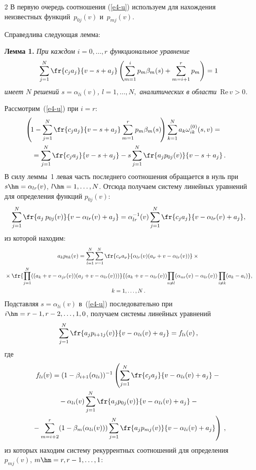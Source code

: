 \begin{multicols}{2}
В первую очередь соотношения (\ref{e4-u}) используем для нахождения 
неизвестных функций~$p_{0j}(v)$ и~$p_{mj}(v)$.

Справедлива следующая лемма:

\medskip

\noindent
\textbf{Лемма 1.} \textit{При каждом $i=0,\ldots,r$ функциональное уравнение}
\begin{equation*}
\sum\limits_{j=1}^N\fr{c_ja_j}
{v-s+a_j}\left(\sum\limits_{m=1}^ip_m\beta_m(s)+\sum\limits_{m=i+1}^rp_m\right)=1
\end{equation*}
\textit{имеет $N$ решений $s=\alpha_{li}(v)$, $l=1,\ldots,N,$ аналитических в 
области~$\mathrm{Re}\,v>0$.}

\smallskip

Рассмотрим~(\ref{e4-u}) при $i=r$:
\begin{multline*}
\hspace*{-5mm}\left(\!1-\sum\limits_{j=1}^N\fr{c_ja_j}{v-s+a_j}
\sum\limits_{m=1}^rp_m\beta_m(s)\!\right)
\sum\limits_{k=1}^N a_k \omega_{ik}^{(0)}(s,v)={}\\
{}=
\sum\limits_{j=1}^N\fr{c_ja_j}{v-s+a_j}-s\sum\limits_{j=1}^N\fr{a_jp_{0j}(v)}{v-s+a_j}\,.
\end{multline*}
В силу леммы~1 левая часть последнего соотношения обращается 
в нуль при $s\hm=\alpha_{lr}(v)$, $l\hm=1,\ldots,N$. Отсюда
получаем систему линейных уравнений для определения функций $p_{0j}(v)$:
\begin{equation*}
\sum\limits_{j=1}^N\fr{a_j\:p_{0j}(v)}{v-\alpha_{lr}(v)+a_j}=
\alpha_{lr}^{-1}(v)\sum\limits_{j=1}^N\fr{c_ja_j}{v-\alpha_{lr}(v)+a_j},
\end{equation*}
из которой находим:
\begin{multline*}
a_k p_{0k}(v)=\sum\limits_{l=1}^N\sum\limits_{\nu=1}^N\fr{c_{\nu}a_{\nu}}
{\alpha_{lr}(v)(a_\nu+v-\alpha_{lr}(v))}\times{}\\
{}\times
\fr{\prod\limits_{j=1}^N((a_k+v-\alpha_{jr}(v))(a_j+v-\alpha_{lr}(v)))}
{(a_k+v-\alpha_{lr}(v)) \!\prod\limits_{n\ne l}(\alpha_{nr}(v)-\alpha_{lr}(v))
\prod\limits_{i\ne k}(a_k-a_i)},\\
k=1,\ldots,N\,.
\end{multline*}
Подставляя $s=\alpha_{li}(v)$ в~(\ref{e4-u}) последовательно при $i\hm=r-1,r-2,\ldots,1,0$,  
получаем системы линейных уравнений
\begin{equation*}
\sum\limits_{j=1}^N\fr{a_j p_{i+1j}(v)}{v-\alpha_{li}(v)+a_j}=f_{li}(v)\,,
\end{equation*}
где
\begin{multline*}
f_{li}(v)=(1-\beta_{i+1}(\alpha_{li}))^{-1}\left(\sum\limits_{j=1}^N\fr{c_ja_j}
{v-\alpha_{li}(v)+a_j}-{}\right.\\
{}-\alpha_{li}(v)\sum\limits_{j=1}^N\fr{a_jp_{0j}(v)}{v-\alpha_{li}(v)+a_j}-{}\\
\left.{}-\sum\limits_{m=i+2}^r
(1-\beta_m(\alpha_{li}(v)))\sum\limits_{j=1}^N\fr{a_jp_{mj}(v)}{v-\alpha_{li}(v)+a_j}\right)\,,
\end{multline*}
из которых находим систему рекуррентных соотношений для определения 
$p_{mj}(v)$, $m\hm=r,r-1,\ldots,1$:


\end{multicols}
